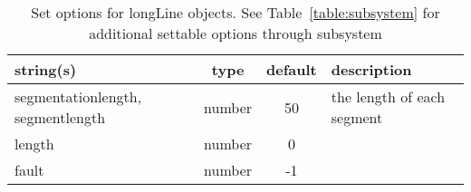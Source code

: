 \begin{table}[ht]
\centering
\begin{tabular}{p{5cm} c c p{7cm}}
\hline
string(s) & type & default & description \\
\hline
segmentationlength, segmentlength & number & 50 & the length of each segment\\
length & number & 0 & \\
fault & number & -1 & \\
\hline
\end{tabular}
\caption{Set options for longLine objects. See Table~\ref{table:subsystem} for additional settable options through subsystem}
\label{table:longLine}
\end{table}

